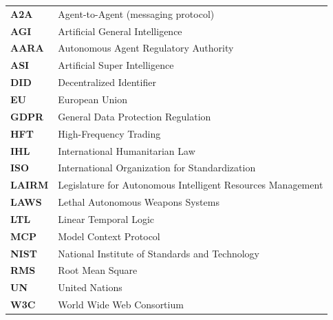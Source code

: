 \begin{tabular}{ll}
\textbf{A2A} & Agent-to-Agent (messaging protocol) \\
\textbf{AGI} & Artificial General Intelligence \\
\textbf{AARA} & Autonomous Agent Regulatory Authority \\
\textbf{ASI} & Artificial Super Intelligence \\
\textbf{DID} & Decentralized Identifier \\
\textbf{EU} & European Union \\
\textbf{GDPR} & General Data Protection Regulation \\
\textbf{HFT} & High-Frequency Trading \\
\textbf{IHL} & International Humanitarian Law \\
\textbf{ISO} & International Organization for Standardization \\
\textbf{LAIRM} & Legislature for Autonomous Intelligent Resources Management \\
\textbf{LAWS} & Lethal Autonomous Weapons Systems \\
\textbf{LTL} & Linear Temporal Logic \\
\textbf{MCP} & Model Context Protocol \\
\textbf{NIST} & National Institute of Standards and Technology \\
\textbf{RMS} & Root Mean Square \\
\textbf{UN} & United Nations \\
\textbf{W3C} & World Wide Web Consortium \\
\end{tabular}
